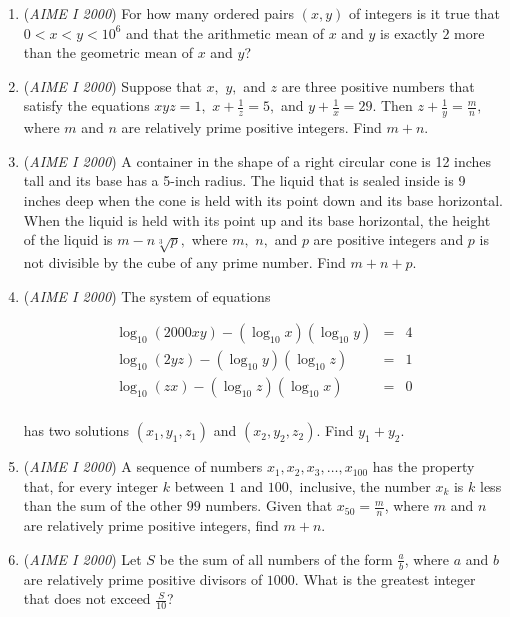 \begin{enumerate}
 

	\item (\textit{AIME I 2000}) For how many ordered pairs $(x,y)$ of integers is it true that $0 < x < y < 10^{6}$ and that the arithmetic mean of $x$ and $y$ is exactly $2$ more than the geometric mean of $x$ and $y$?


 

	\item (\textit{AIME I 2000}) Suppose that $x,$ $y,$ and $z$ are three positive numbers that satisfy the equations $xyz = 1,$ $x + \frac {1}{z} = 5,$ and $y + \frac {1}{x} = 29.$ Then $z + \frac {1}{y} = \frac {m}{n},$ where $m$ and $n$ are relatively prime positive integers. Find $m + n$.


 

	\item (\textit{AIME I 2000}) A container in the shape of a right circular cone is 12 inches tall and its base has a 5-inch radius. The liquid that is sealed inside is 9 inches deep when the cone is held with its point down and its base horizontal. When the liquid is held with its point up and its base horizontal, the height of the liquid is $m - n\sqrt [3]{p},$ where $m,$ $n,$ and $p$ are positive integers and $p$ is not divisible by the cube of any prime number. Find $m + n + p$.


 

	\item (\textit{AIME I 2000}) The system of equations

 \begin{eqnarray*}\log_{10}(2000xy) - (\log_{10}x)(\log_{10}y) & = & 4 \\ \log_{10}(2yz) - (\log_{10}y)(\log_{10}z) & = & 1 \\ \log_{10}(zx) - (\log_{10}z)(\log_{10}x) & = & 0 \\ \end{eqnarray*}


 has two solutions $(x_{1},y_{1},z_{1})$ and $(x_{2},y_{2},z_{2})$. Find $y_{1} + y_{2}$.


 

	\item (\textit{AIME I 2000}) A sequence of numbers $x_{1},x_{2},x_{3},\ldots,x_{100}$ has the property that, for every integer $k$ between $1$ and $100,$ inclusive, the number $x_{k}$ is $k$ less than the sum of the other $99$ numbers. Given that $x_{50} = \frac{m}{n}$, where $m$ and $n$ are relatively prime positive integers, find $m + n$.


 

	\item (\textit{AIME I 2000}) Let $S$ be the sum of all numbers of the form $\frac{a}{b}$, where $a$ and $b$ are relatively prime positive divisors of $1000.$ What is the greatest integer that does not exceed $\frac{S}{10}$?



\end{enumerate}
